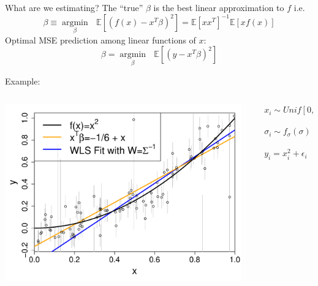 \documentclass[12pt]{beamer}
\newcommand{\argmin}[1]{\underset{#1}{\operatorname{argmin}}\text{ }}
\newcommand{\E}{\mathbb{E}}
\begin{document}
\begin{frame}{What are we estimating?}
The ``true'' $\beta$ is the best linear approximation to $f$ i.e.
  \begin{equation*}
  \beta \equiv \argmin{\beta} \E[(f(x) - x^T\beta)^2] = \E[xx^T]^{-1}\E[xf(x)]
\end{equation*}
  Optimal MSE prediction among linear functions of $x$:
  \begin{equation*}
    \beta = \argmin{\beta} \E[(y - x^T\beta)^2]
  \end{equation*}

  
Example:
  
  \begin{columns}
    \begin{column}{0.5\textwidth}
      \includegraphics[scale=0.3]{figs/data.pdf}
    \end{column}
    \begin{column}{0.5\textwidth}
      \begin{align*}
        &x_i \sim Unif[0,1]\\
        &\sigma_i \sim f_{\sigma}(\sigma) = \left\{
          \begin{array}{lr}
            0.05 \! &:  \! \sigma=0.01,1.0\\ 
            0.9  \! &: \! \sigma=0.1\\
          \end{array} \right.\\
        &y_i = x_i^2 + \epsilon_i
        \end{align*}
    \end{column}
  \end{columns}
\end{frame}
\end{document}
